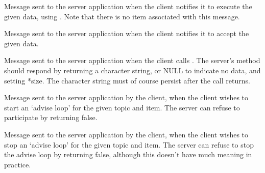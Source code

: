 \label{wxconnectiononexecute}


Message sent to the server application when the client notifies
it to execute the given data, using .
Note that there is no item associated with this message.

\label{wxconnectiononpoke}


Message sent to the server application when the client notifies it to
accept the given data.

\label{wxconnectiononrequest}


Message sent to the server application when the client calls 
. The
server's  method
should respond by returning a character string, or NULL to
indicate no data, and setting *size. The character string must of
course persist after the call returns.

\label{wxconnectiononstartadvise}


Message sent to the server application by the client, when the client
wishes to start an `advise loop' for the given topic and item. The
server can refuse to participate by returning false.

\label{wxconnectiononstopadvise}


Message sent to the server application by the client, when the client
wishes to stop an `advise loop' for the given topic and item. The
server can refuse to stop the advise loop by returning false, although
this doesn't have much meaning in practice.

